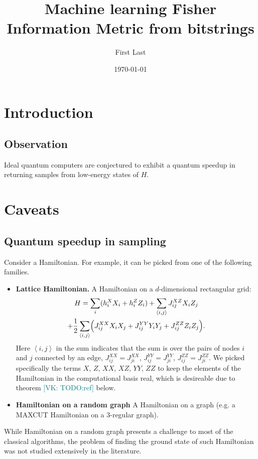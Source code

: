 \documentclass[twocolumn]{revtex4-2}
\newcommand{\VK}[1]{\textcolor{teal}{[VK: #1]}}
\begin{document}
\title{Machine learning Fisher Information Metric from bitstrings}
\author{First Last}

\date{\today}




\maketitle

\section{Introduction}
\subsection{Observation}
Ideal quantum computers are conjectured to exhibit
a quantum speedup in returning samples from
low-energy states of $H$.

\section{Caveats}
\subsection{Quantum speedup in sampling}
Consider a Hamiltonian. For example, it can be picked from one of the
following families.
\begin{itemize}
  \item \textbf{Lattice Hamiltonian.} A Hamiltonian on a $d$-dimensional
    rectangular grid:
    \begin{multline}
      H = \sum_{i} (h^{X}_{i} X_i + h^{Z}_i Z_i)
        + \sum_{\left<i,j\right>} J^{XZ}_{ij}X_iZ_j \\
          + \frac12\sum_{\left<i,j\right>}\Bigl(J^{XX}_{ij}X_iX_j
          + J^{YY}_{ij}Y_iY_j + J^{ZZ}_{ij}Z_iZ_j\Bigr).
    \end{multline}
    Here $\left<i,j\right>$ in the sum indicates that the sum is over
    the pairs of nodes $i$ and $j$ connected by an edge,
    $J^{XX}_{ij} = J^{XX}_{ji}$,
    $J^{YY}_{ij} = J^{YY}_{ji}$,
    $J^{ZZ}_{ij} = J^{ZZ}_{ji}$.
    We picked specifically the terms $X$, $Z$, $XX$, $XZ$, $YY$, $ZZ$ to
    keep the elements of the Hamiltonian in the computational basis real,
    which is desireable due to theorem \VK{TODO:ref} below.
  \item \textbf{Hamiltonian on a random graph}
    A Hamiltonian on a graph (e.g. a MAXCUT Hamiltonian
    on a 3-regular graph).
\end{itemize}
While Hamiltonian on a random graph presents a challenge to most of the
classical algorithms, the problem of finding the ground state of such
Hamiltonian was not studied extensively in the literature.
\end{document}
